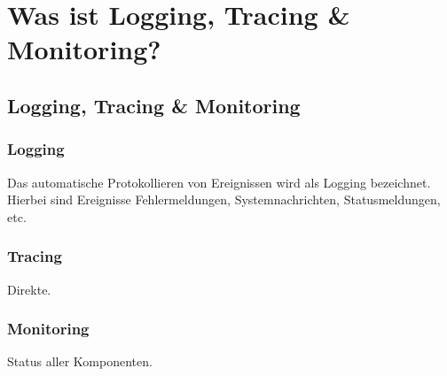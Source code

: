 \chapter{Was ist Logging, Tracing {\selectfont \&} Monitoring?}\label{ch:was-ist-logging-tracing-&-monitoring?}


\section{Logging, Tracing {\selectfont \&} Monitoring}\label{sec:logging-tracing-&-monitoring}

\subsection{Logging}\label{subsec:logging}
Das automatische Protokollieren von Ereignissen wird als Logging bezeichnet.
Hierbei sind Ereignisse Fehlermeldungen, Systemnachrichten, Statusmeldungen, etc.\autocite{ip-insider, ait, owasp}

\subsection{Tracing}\label{subsec:tracing}
Direkte.\autocite{adesso, monstarlab}

\subsection{Monitoring}\label{subsec:monitoring}
Status aller Komponenten.\autocite{cloudradar, wbs, crossmedia}

